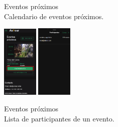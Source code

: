 \begin{figure}[H]
\begin{minipage}{0.45\textwidth}
		\caption{Eventos próximos \\ Calendario de eventos próximos.}
		\label{fig:eventos-proximos-lista-mobile}
	\end{minipage}
\end{figure}

\begin{figure}[H]
	\centering
	\includegraphics[width=0.15\textwidth]{7-Construccion/Manuales/mobile/participantes.png}
	\includegraphics[width=0.15\textwidth]{7-Construccion/Manuales/mobile/lista participantes.png}
	\caption{Eventos próximos \\ Lista de participantes de un evento.}
	\label{fig:eventos-proximos-participantes}
\end{figure}